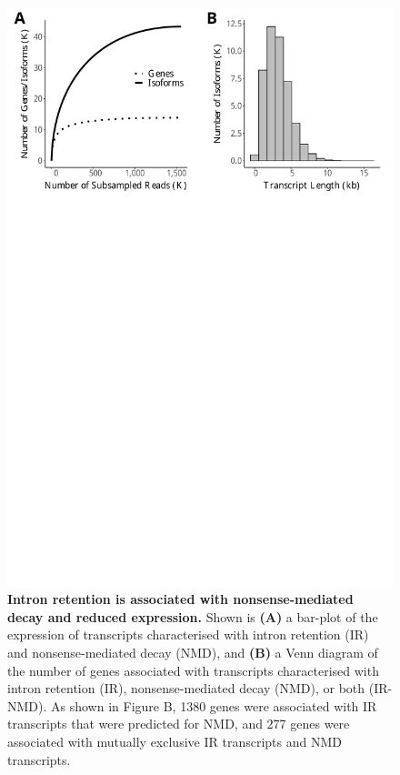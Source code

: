 \begin{figure}[!h]
	\begin{center}
		\includegraphics[page=6,trim={0 26cm 0 0},clip,scale = 0.55]{Figures/IsoSeqWholeTranscriptome.pdf}
	\end{center}
	\captionsetup{width=0.95\textwidth}
	\caption[Association of intron retention and nonsense-mediated decay]%
	{\textbf{Intron retention is associated with nonsense-mediated decay and reduced expression.} Shown is \textbf{(A)} a bar-plot of the expression of transcripts characterised with intron retention (IR) and nonsense-mediated decay (NMD), and \textbf{(B)} a Venn diagram of the number of genes associated with transcripts characterised with intron retention (IR), nonsense-mediated decay (NMD), or both (IR-NMD). As shown in Figure B, 1380 genes were associated with IR transcripts that were predicted for NMD, and 277 genes were associated with mutually exclusive IR transcripts and NMD transcripts. }
	\label{fig:isoseq_whole_IRNMD}
\end{figure}


